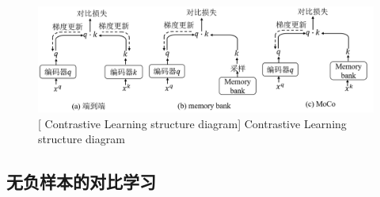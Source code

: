 \begin{figure}[h]
    \centering
    \includegraphics[width=1.0\columnwidth]{figures/RelatedWork/对比学习结构.png}
    [ Contrastive Learning structure diagram]{ Contrastive Learning structure diagram}
    \label{figure1: 对比学习结构示意图}
\end{figure}





\subsection[\hspace{-2pt}无负样本的对比学习]{{\heiti{} \hspace{-8pt}无负样本的对比学习}}\label{section2: 无负样本的对比学习}

